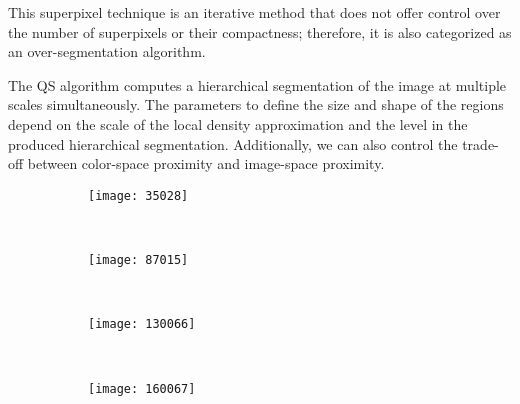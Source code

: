 This superpixel technique is an iterative method that does not offer control over the number of superpixels or their compactness; therefore, it is also categorized as an over-segmentation algorithm.

The QS algorithm computes a hierarchical segmentation of the image at multiple scales simultaneously. The parameters to define the size and shape of the regions depend on the scale of the local density approximation and the level in the produced hierarchical segmentation. Additionally, we can also control the trade-off between color-space proximity and image-space proximity.

\begin{figure}[!ht]
    \centering
    \begin{subfigure}[t]{\textwidth+20pt\relax}
    	\texttt{[image: 35028]} 
    \end{subfigure}      
    ~ %
    \begin{subfigure}[b]{0.2\textwidth}
        \texttt{[image: 87015]}
    \end{subfigure}
    ~ %
    \begin{subfigure}[b]{0.2\textwidth}
        \texttt{[image: 130066]}
    \end{subfigure}
    ~ %
    \begin{subfigure}[b]{0.2\textwidth}
        \texttt{[image: 160067]}
    \end{subfigure} \\[2ex]       
    

\end{figure}
